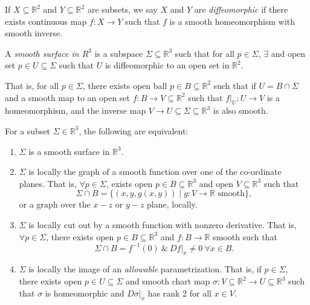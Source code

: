 \begin{definition}
    If \(X \subseteq \mathbb{R}^2\) and \(Y \subseteq \mathbb{R}^2\) are subsets, we say \(X\) and \(Y\) are \textit{diffeomorphic} if there exists continuous map \(f: X \to Y\) such that \(f\) is a smooth homeomorphism with smooth inverse.
\end{definition}
\begin{definition}
    A \textit{smooth surface in \(R^3\)} is a subspace \(\Sigma\subseteq \mathbb{R}^3\) such that for all \(p \in \Sigma\), \(\exists\) and open set \(p \in U \subseteq \Sigma\) such that \(U\) is diffeomorphic to an open set in \(\mathbb{R}^2\).

    That is, for all \(p \in \Sigma\), there exists open ball \(p \in B \subseteq \mathbb{R}^2\) such that if \(U = B \cap \Sigma\) and a smooth map to an open set \(f: B\to V \subseteq \mathbb{R}^2\) such that \(\left. f\right|_{U}:U\to V\) is a homeomorphism, and the inverse map \(V \to U \subseteq \Sigma \subseteq \mathbb{R}^3\) is also smooth.
\end{definition}
\begin{theorem}
    \label{abseq}
    For a subset \(\Sigma\in \mathbb{R}^3\), the following are equivalent:
    \begin{enumerate}
        \item \(\Sigma\) is a smooth surface in \(\mathbb{R}^3\).
        \item \(\Sigma\) is locally the graph of a smooth function over one of the co-ordinate planes. That is, \(\forall p \in \Sigma\), exists open \(p \in B \subseteq \mathbb{R}^3\) and open \(V \subseteq \mathbb{R}^3\) such that
        \[
            \Sigma \cap B = \{(x,y,g(x,y))\mid g:V \to \mathbb{R} \text{ smooth}\},
        \]
        or a graph over the \(x-z\) or \(y-z\) plane, locally.
        \item \(\Sigma\) is locally cut out by a smooth function with nonzero derivative. That is, \(\forall p \in \Sigma\), there exists open \(p \in B \subseteq \mathbb{R}^3\) and \(f: B \to \mathbb{R}\) smooth such that
        \[
            \Sigma \cap B = f^{-1}(0)~\&~\left. Df\right|_x \neq 0~\forall x \in B.
        \]
        \item \(\Sigma\) is locally the image of an \textit{allowable} parametrization. That is, if \(p \in \Sigma\), there exists open \(p \in U \subseteq \Sigma\) and smooth chart map \(\sigma: V\subseteq \mathbb{R}^2 \to U\subseteq\mathbb{R}^3\) such that \(\sigma\) is homeomorphic and \(\left.D\sigma \right|_x\) has rank 2 for all \(x \in V\).
    \end{enumerate} 
\end{theorem}
